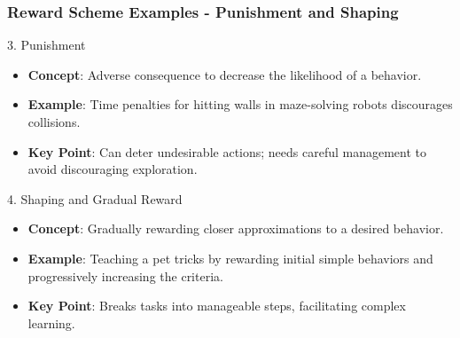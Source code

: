 \documentclass[aspectratio=169]{beamer}
\begin{document}
\begin{frame}[fragile]
    \frametitle{Reward Scheme Examples - Punishment and Shaping}
    \begin{block}{3. Punishment}
        \begin{itemize}
            \item \textbf{Concept}: Adverse consequence to decrease the likelihood of a behavior.
            \item \textbf{Example}: Time penalties for hitting walls in maze-solving robots discourages collisions.
            \item \textbf{Key Point}: Can deter undesirable actions; needs careful management to avoid discouraging exploration.
        \end{itemize}
    \end{block}
    
    \begin{block}{4. Shaping and Gradual Reward}
        \begin{itemize}
            \item \textbf{Concept}: Gradually rewarding closer approximations to a desired behavior.
            \item \textbf{Example}: Teaching a pet tricks by rewarding initial simple behaviors and progressively increasing the criteria.
            \item \textbf{Key Point}: Breaks tasks into manageable steps, facilitating complex learning.
        \end{itemize}
    \end{block}
\end{frame}
\end{document}
